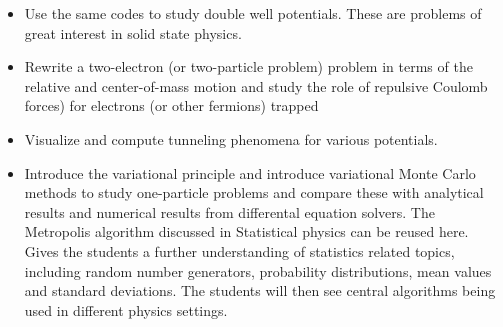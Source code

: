 \documentclass[graybox,envcountchap,sectrefs]{svmult}
\begin{document}
\begin{itemize}
\item Use the same codes to study double well potentials. These are problems of great interest in solid state physics.

\item Rewrite a two-electron (or two-particle problem) problem in terms of the relative and center-of-mass motion and study the role of repulsive Coulomb forces) for electrons (or other fermions) trapped

\item Visualize and compute tunneling phenomena for various potentials.

\item Introduce the  variational principle and introduce variational Monte Carlo methods to study one-particle problems and compare these with analytical results and numerical results from differental equation solvers.  The Metropolis algorithm discussed in Statistical physics can be reused here. Gives the students a further understanding of statistics related topics, including random number generators, probability distributions, mean values and standard deviations. The students will then see central algorithms being used in different physics settings.
\end{itemize}
\end{document}
